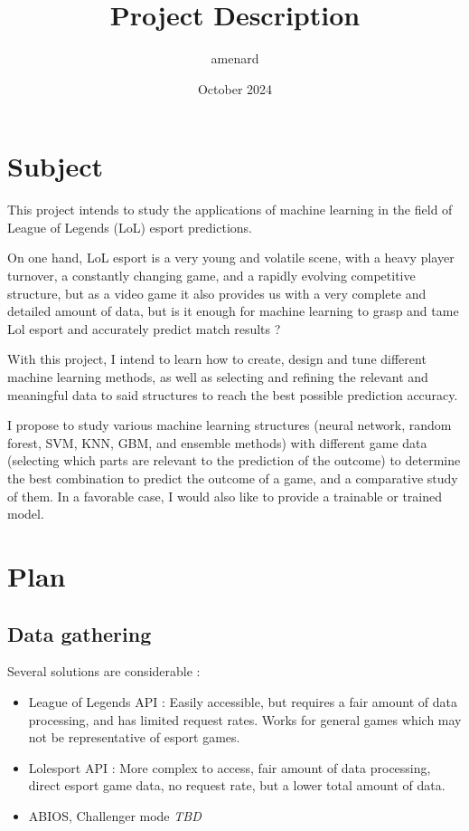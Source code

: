 \documentclass{article}
\title{Project Description}
\author{amenard }
\date{October 2024}
\begin{document}
\maketitle

\section{Subject}
This project intends to study the applications of machine learning in the field of League of Legends (LoL) esport predictions.

On one hand, LoL esport is a very young and volatile scene, with a heavy player turnover, a constantly changing game, and a rapidly evolving competitive structure, but as a video game it also provides us with a very complete and detailed amount of data, but is it enough for machine learning to grasp and tame Lol esport and accurately predict match results ?

With this project, I intend to learn how to create, design and tune different machine learning methods, as well as selecting and refining the relevant and meaningful data to said structures to reach the best possible prediction accuracy.

I propose to study various machine learning structures (neural network, random forest, SVM, KNN, GBM, and ensemble methods) with different game data (selecting which parts are relevant to the prediction of the outcome) to determine the best combination to predict the outcome of a game, and a comparative study of them. In a favorable case, I would also like to provide a trainable or trained model.

\section{Plan}
\subsection{Data gathering}
Several solutions are considerable :
\begin{itemize}
    \item League of Legends API : Easily accessible, but requires a fair amount of data processing, and has limited request rates. Works for general games which may not be representative of esport games.
    \item Lolesport API : More complex to access, fair amount of data processing, direct esport game data, no request rate, but a lower total amount of data.
    \item ABIOS, Challenger mode \textit{TBD}
\end{itemize}
\end{document}
